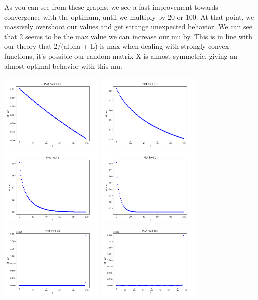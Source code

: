 \documentclass[12pt]{article}
\begin{document}
    As you can see from these graphs, we see a fast improvement towards convergence with the 
    optimum, until we multiply by 20 or 100. At that point, we massively overshoot our values and get
    strange unexpected behavior. We can see that 2 seems to be the max value we can increase our mu by.
    This is in line with our theory that 2/(alpha + L) is max when dealing with strongly convex functions, 
    it's possible our random matrix X is almost symmetric, giving an almost optimal behavior with this 
    mu.
    \begin{center}
    \includegraphics[width=5cm]{part 4/Figure_1.png}
    \includegraphics[width=5cm]{part 4/Figure_2.png}
    \includegraphics[width=5cm]{part 4/Figure_3.png}
    \includegraphics[width=5cm]{part 4/Figure_4.png}
    \includegraphics[width=5cm]{part 4/Figure_5.png}
    \includegraphics[width=5cm]{part 4/Figure_6.png}
    \end{center}
\end{document}
